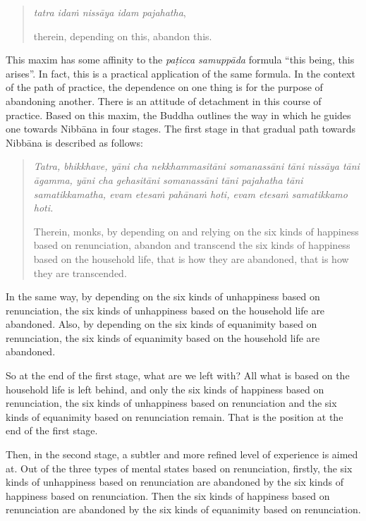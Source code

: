 \begin{quote}
\emph{tatra idaṁ nissāya idam pajahatha},

therein, depending on this, abandon this.
\end{quote}

This maxim has some affinity to the \emph{paṭicca samuppāda} formula ``this being, this arises''. In fact, this is a practical application of the same formula. In the context of the path of practice, the dependence on one thing is for the purpose of abandoning another. There is an attitude of detachment in this course of practice. Based on this maxim, the Buddha outlines the way in which he guides one towards Nibbāna in four stages. The first stage in that gradual path towards Nibbāna is described as follows:

\begin{quote}
\emph{Tatra, bhikkhave, yāni cha nekkhammasitāni somanassāni tāni nissāya tāni āgamma, yāni cha gehasitāni somanassāni tāni pajahatha tāni samatikkamatha, evam etesaṁ pahānaṁ hoti, evam etesaṁ samatikkamo hoti.}

Therein, monks, by depending on and relying on the six kinds of happiness based on renunciation, abandon and transcend the six kinds of happiness based on the household life, that is how they are abandoned, that is how they are transcended.
\end{quote}

In the same way, by depending on the six kinds of unhappiness based on renunciation, the six kinds of unhappiness based on the household life are abandoned. Also, by depending on the six kinds of equanimity based on renunciation, the six kinds of equanimity based on the household life are abandoned.

So at the end of the first stage, what are we left with? All what is based on the household life is left behind, and only the six kinds of happiness based on renunciation, the six kinds of unhappiness based on renunciation and the six kinds of equanimity based on renunciation remain. That is the position at the end of the first stage.

Then, in the second stage, a subtler and more refined level of experience is aimed at. Out of the three types of mental states based on renunciation, firstly, the six kinds of unhappiness based on renunciation are abandoned by the six kinds of happiness based on renunciation. Then the six kinds of happiness based on renunciation are abandoned by the six kinds of equanimity based on renunciation.

